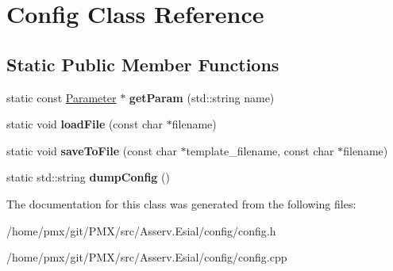\hypertarget{classConfig}{}\section{Config Class Reference}
\label{classConfig}
\subsection*{Static Public Member Functions}
\begin{DoxyCompactItemize}
\item 
\mbox{\label{classConfig_a714628e12fc1aee4e0bfe45a3daf11e5}} 
static const \hyperlink{structParameter}{Parameter} $\ast$ {\bfseries get\+Param} (std\+::string name)
\item 
\mbox{\label{classConfig_ad798f4d9c410a94b0fb209e93bdfb5b0}} 
static void {\bfseries load\+File} (const char $\ast$filename)
\item 
\mbox{\label{classConfig_a2ee348174cd0b33e95a5e751d68f4d6c}} 
static void {\bfseries save\+To\+File} (const char $\ast$template\+\_\+filename, const char $\ast$filename)
\item 
\mbox{\label{classConfig_a6a9fbb85a80ba5987635b0adc89c1ab1}} 
static std\+::string {\bfseries dump\+Config} ()
\end{DoxyCompactItemize}


The documentation for this class was generated from the following files\+:\begin{DoxyCompactItemize}
\item 
/home/pmx/git/\+P\+M\+X/src/\+Asserv.\+Esial/config/config.\+h\item 
/home/pmx/git/\+P\+M\+X/src/\+Asserv.\+Esial/config/config.\+cpp\end{DoxyCompactItemize}
